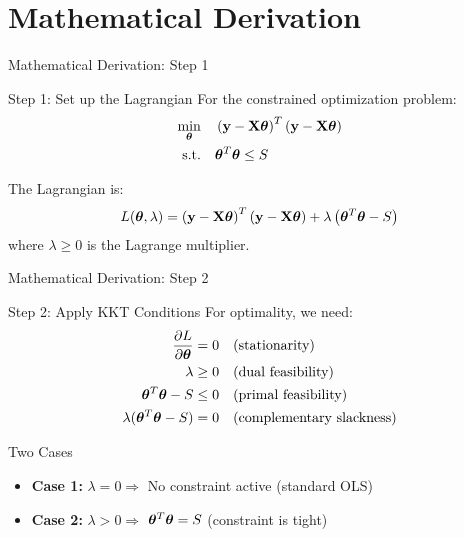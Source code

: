 \documentclass{beamer}
\begin{document}
\section{Mathematical Derivation}

\begin{frame}{Mathematical Derivation: Step 1}
\begin{codebox}{Step 1: Set up the Lagrangian}
{\small For the constrained optimization problem:}
\begin{align*}
\min_{\boldsymbol{\theta}} & \quad \left(\mathbf{y}-\mathbf{X}\boldsymbol{\theta}\right)^T\left(\mathbf{y}-\mathbf{X}\boldsymbol{\theta}\right) \\
\text{s.t.} & \quad \boldsymbol{\theta}^T\boldsymbol{\theta} \leq S
\end{align*}

{\small The Lagrangian is:}
$$L(\boldsymbol{\theta}, \lambda) = \left(\mathbf{y}-\mathbf{X}\boldsymbol{\theta}\right)^T\left(\mathbf{y}-\mathbf{X}\boldsymbol{\theta}\right) + \lambda\left(\boldsymbol{\theta}^T\boldsymbol{\theta} - S\right)$$
{\small where $\lambda \geq 0$ is the Lagrange multiplier.}
\end{codebox}
\end{frame}

\begin{frame}{Mathematical Derivation: Step 2}
\begin{codebox}{Step 2: Apply KKT Conditions}
For optimality, we need:
\begin{align}
\frac{\partial L}{\partial \boldsymbol{\theta}} &= 0 \quad \text{(stationarity)} \\
\lambda &\geq 0 \quad \text{(dual feasibility)} \\
\boldsymbol{\theta}^T\boldsymbol{\theta} - S &\leq 0 \quad \text{(primal feasibility)} \\
\lambda(\boldsymbol{\theta}^T\boldsymbol{\theta} - S) &= 0 \quad \text{(complementary slackness)}
\end{align}
\end{codebox}
\pause

\begin{keypointsbox}{Two Cases}
\begin{itemize}
\item \textbf{Case 1:} $\lambda = 0 \Rightarrow$ No constraint active (standard OLS)
\item \textbf{Case 2:} $\lambda > 0 \Rightarrow$ $\boldsymbol{\theta}^T\boldsymbol{\theta} = S$ (constraint is tight)
\end{itemize}
\end{keypointsbox}
\end{frame}
\end{document}

